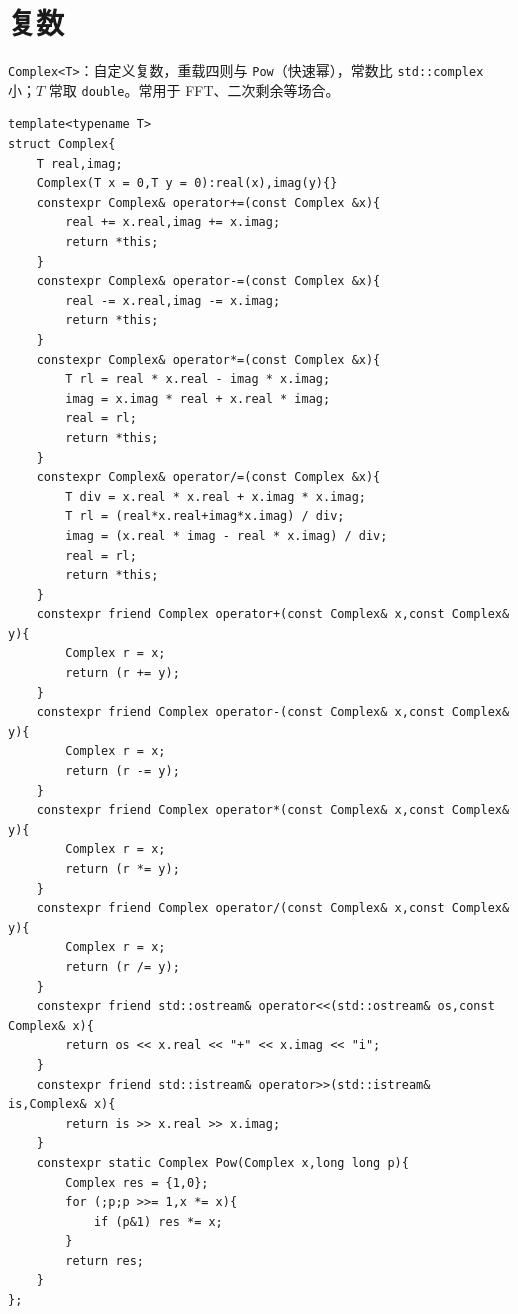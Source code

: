\section{复数}

\verb|Complex<T>|：自定义复数，重载四则与 \verb|Pow|（快速幂），常数比 \texttt{std::complex} 小；$T$ 常取 \texttt{double}。常用于 FFT、二次剩余等场合。

\begin{lstlisting}
template<typename T>
struct Complex{
    T real,imag;
    Complex(T x = 0,T y = 0):real(x),imag(y){}
    constexpr Complex& operator+=(const Complex &x){
        real += x.real,imag += x.imag;
        return *this;
    }
    constexpr Complex& operator-=(const Complex &x){
        real -= x.real,imag -= x.imag;
        return *this;
    }
    constexpr Complex& operator*=(const Complex &x){
        T rl = real * x.real - imag * x.imag;
        imag = x.imag * real + x.real * imag;
        real = rl;
        return *this;
    }
    constexpr Complex& operator/=(const Complex &x){
        T div = x.real * x.real + x.imag * x.imag;
        T rl = (real*x.real+imag*x.imag) / div;
        imag = (x.real * imag - real * x.imag) / div;
        real = rl;
        return *this;
    }
    constexpr friend Complex operator+(const Complex& x,const Complex& y){
        Complex r = x;
        return (r += y);
    }
    constexpr friend Complex operator-(const Complex& x,const Complex& y){
        Complex r = x;
        return (r -= y);
    }
    constexpr friend Complex operator*(const Complex& x,const Complex& y){
        Complex r = x;
        return (r *= y);
    }
    constexpr friend Complex operator/(const Complex& x,const Complex& y){
        Complex r = x;
        return (r /= y);
    }
    constexpr friend std::ostream& operator<<(std::ostream& os,const Complex& x){
        return os << x.real << "+" << x.imag << "i";
    }
    constexpr friend std::istream& operator>>(std::istream& is,Complex& x){
        return is >> x.real >> x.imag;
    }
    constexpr static Complex Pow(Complex x,long long p){
        Complex res = {1,0};
        for (;p;p >>= 1,x *= x){
            if (p&1) res *= x;
        }
        return res;
    }
};
\end{lstlisting}
